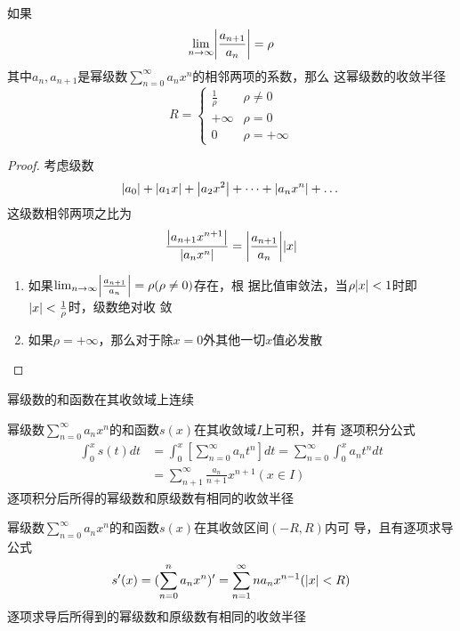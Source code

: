 \documentclass[11pt]{article}
\begin{document}
\begin{theorem}[]
如果
\begin{equation*}
\lim_{n\to\infty}\abs{\frac{a_{n+1}}{a_n}}=\rho
\end{equation*}
其中\(a_n,a_{n+1}\)是幂级数\(\sum_{n=0}^\infty a_nx^n\)的相邻两项的系数，那么
这幂级数的收敛半径
\begin{equation*}
R=
\begin{cases}
\frac{1}{\rho}&\rho\neq0\\
+\infty&\rho=0\\
0&\rho=+\infty
\end{cases}
\end{equation*}
\end{theorem}

\begin{proof}
考虑级数
\begin{equation*}
\abs{a_0}+\abs{a_1x}+\abs{a_2x^2}+\dots+\abs{a_nx^n}+\dots
\end{equation*}
这级数相邻两项之比为
\begin{equation*}
\frac{\abs{a_{n+1}x^{n+1}}}{\abs{a_nx^n}}=\abs{\frac{a_{n+1}}{a_n}}\abs{x}
\end{equation*}

\begin{enumerate}
\item 如果\(\lim_{n\to\infty}\abs{\frac{a_{n+1}}{a_n}}=\rho(\rho\neq0)\)存在，根
据比值审敛法，当\(\rho\abs{x}<1\)时即\(\abs{x}<\frac{1}{\rho}\)时，级数绝对收
敛
\item 如果\(\rho=+\infty\)，那么对于除\(x=0\)外其他一切\(x\)值必发散
\end{enumerate}
\end{proof}

\begin{proposition}[]
幂级数的和函数在其收敛域上连续
\end{proposition}

\begin{proposition}[]
幂级数\(\sum_{n=0}^\infty a_nx^n\)的和函数\(s(x)\)在其收敛域\(I\)上可积，并有
逐项积分公式
\begin{align*}
\int_0^xs(t)dt&=\int_0^x[\sum_{n=0}^\infty a_nt^n]dt=
\sum_{n=0}^\infty\int_0^xa_nt^ndt\\
&=\sum_{n+1}^\infty\frac{a_n}{n+1}x^{n+1}(x\in I)
\end{align*}
逐项积分后所得的幂级数和原级数有相同的收敛半径
\end{proposition}

\begin{proposition}[]
幂级数\(\sum_{n=0}^\infty a_nx^n\)的和函数\(s(x)\)在其收敛区间\((-R,R)\)内可
导，且有逐项求导公式
\begin{equation*}
s'(x)=(\sum_{n=0}^na_nx^n)'=\sum_{n=1}^\infty na_nx^{n-1}(\abs{x}<R)
\end{equation*}
逐项求导后所得到的幂级数和原级数有相同的收敛半径
\end{proposition}
\end{document}

